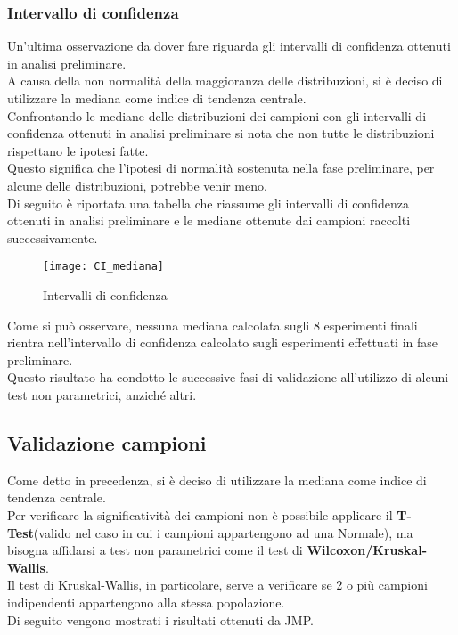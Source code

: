 \subsubsection{Intervallo di confidenza}
Un’ultima osservazione da dover fare riguarda gli intervalli di confidenza ottenuti in
analisi preliminare.\\
A causa della non normalità della maggioranza delle distribuzioni, si è deciso di
utilizzare la mediana come indice di tendenza centrale. \\
Confrontando le mediane delle distribuzioni dei campioni
con gli intervalli di confidenza ottenuti in analisi preliminare si nota che non
tutte le distribuzioni rispettano le ipotesi fatte.\\ Questo significa che l’ipotesi
di normalità sostenuta nella fase preliminare, per alcune delle distribuzioni,
potrebbe venir meno.\\
Di seguito è riportata una tabella che riassume gli intervalli di confidenza
ottenuti in analisi preliminare e le mediane ottenute dai campioni raccolti
successivamente.

\begin{figure}[!htbp]
  \texttt{[image: CI\_mediana]}
  \caption{Intervalli di confidenza}
  \label{CI_mediana}
\end{figure}

Come si può osservare, nessuna mediana calcolata sugli 8 esperimenti finali
rientra nell'intervallo di confidenza calcolato sugli esperimenti effettuati
in fase preliminare.\\
Questo risultato ha condotto le successive fasi di validazione all'utilizzo di
alcuni test non parametrici, anziché altri.

\clearpage
\subsection{Validazione campioni}
Come detto in precedenza, si è deciso di utilizzare la mediana come indice di
tendenza centrale.\\
Per verificare la significatività dei campioni non è possibile applicare il
\textbf{T-Test}(valido nel caso in cui i campioni appartengono ad una Normale),
ma bisogna affidarsi a test non parametrici come il test di
\textbf{Wilcoxon/Kruskal-Wallis}.\\
Il test di Kruskal-Wallis, in particolare, serve a verificare se 2 o più campioni
indipendenti appartengono alla stessa popolazione.\\
Di seguito vengono mostrati i risultati ottenuti da JMP.\\

